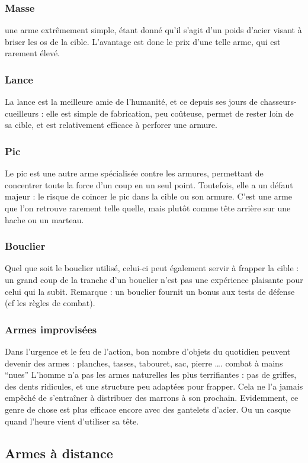 \documentclass[10pt,a4paper,twocolumn]{book}
\begin{document}
\subsubsection{Masse}
une arme extrêmement simple, étant donné qu’il s’agit d’un poids d’acier visant à briser les os de la cible. L’avantage est donc le prix d’une telle arme, qui est rarement élevé.
\subsubsection{Lance}
La lance est la meilleure amie de l’humanité, et ce depuis ses jours de chasseurs-cueilleurs : elle est simple de fabrication, peu coûteuse, permet de rester loin de sa cible, et est relativement efficace à perforer une armure.
\subsubsection{Pic}
Le pic est une autre arme spécialisée contre les armures, permettant de concentrer toute la force d’un coup en un seul point. Toutefois, elle a un défaut majeur : le risque de coincer le pic dans la cible ou son armure. C’est une arme que l’on retrouve rarement telle quelle, mais plutôt comme tête arrière sur une hache ou un marteau.
\subsubsection{Bouclier}
Quel que soit le bouclier utilisé, celui-ci peut également servir à frapper la cible : un grand coup de la tranche d’un bouclier n’est pas une expérience plaisante pour celui qui la subit. Remarque : un bouclier fournit un bonus aux tests de défense (cf les règles de combat).
\subsubsection{Armes improvisées}
Dans l’urgence et le feu de l’action, bon nombre d’objets du quotidien peuvent devenir des armes : planches, tasses, tabouret, sac, pierre ….
combat à mains “nues”
L’homme n’a pas les armes naturelles les plus terrifiantes : pas de griffes, des dents ridicules, et une structure peu adaptées pour frapper. Cela ne l’a jamais empêché de s'entraîner à distribuer des marrons à son prochain. Evidemment, ce genre de chose est plus efficace encore avec des gantelets d’acier. Ou un casque quand l’heure vient d’utiliser sa tête.
\subsection{Armes à distance}
\end{document}
